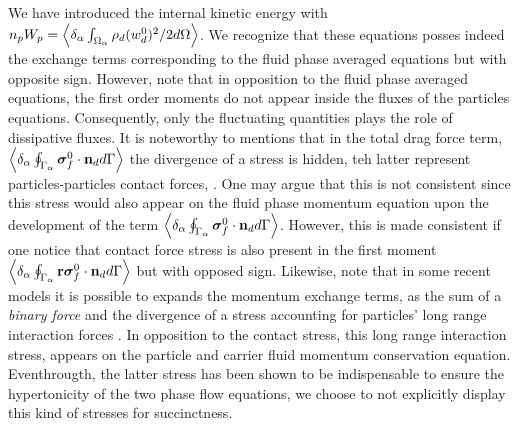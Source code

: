 We have introduced the internal kinetic energy with $n_pW_p = \left<\delta_\alpha \int_{\Omega_\alpha} {\rho_d  (w_d^0)^2/2} d\Omega\right>$. 
We recognize that these equations posses indeed the exchange terms corresponding to the fluid phase averaged equations but with opposite sign. 
However, note that in opposition to the fluid phase averaged equations, the first order moments do not appear inside the fluxes of the particles equations. 
Consequently, only the fluctuating quantities plays the role of dissipative fluxes. 
It is noteworthy to mentions that in the total drag force term, $ \left<\delta_\alpha \oint_{\Gamma_\alpha} {\bm{\sigma}_f^0 \cdot \textbf{n}_d} d\Gamma\right>$ the divergence of a stress is hidden, teh latter represent particles-particles contact forces, \citet{jackson1997locally,zhang1997momentum}. 
One may argue that this is not consistent since this stress would also appear on the fluid phase momentum equation upon the development of the term $\left<\delta_\alpha \oint_{\Gamma_\alpha} \bm{\sigma}_f^0\cdot\textbf{n}_d d\Gamma\right>$. 
However, this is made consistent if one notice that contact force stress is also present in the first moment $\left<\delta_\alpha \oint_{\Gamma_\alpha} \textbf{r}\bm{\sigma}_f^0\cdot\textbf{n}_d d\Gamma\right>$ but with opposed sign. 
Likewise, note that in some recent models it is possible to expands the momentum exchange terms, as the sum of a \textit{binary force} and the divergence of a stress accounting for particles' long range interaction forces \citep{zhang2021ensemble,nott2011suspension}. 
In opposition to the contact stress, this long range interaction stress, appears on the particle and carrier fluid momentum conservation equation. 
Eventhrougth, the latter stress has been shown to be indispensable to ensure the hypertonicity of the two phase flow equations\citep{fox2020hyperbolic}, we choose to not explicitly display this kind of stresses for succinctness. 


